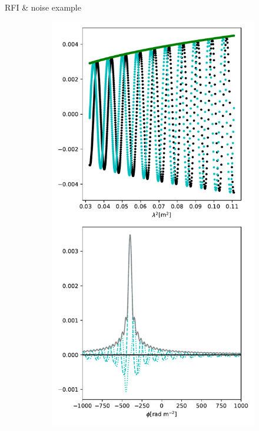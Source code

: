 \documentclass[xetex,aspectratio=169]{beamer}
\begin{document}
    \begin{frame}{RFI \& noise example}
    
        \begin{figure}
            \centering
            
            \begin{subfigure}{0.2\textwidth}
                \includegraphics[width=\textwidth]{figures/dataset_features/data_normal.pdf}

\end{subfigure}
\end{figure}
\end{frame}
\end{document}
